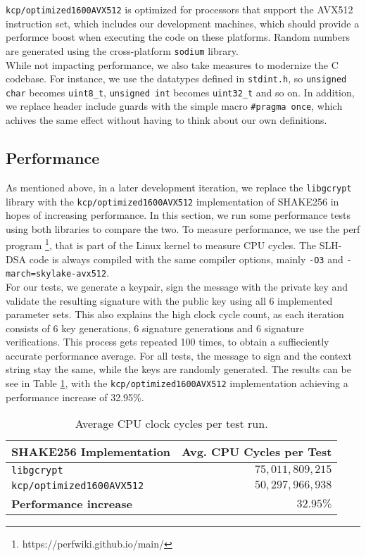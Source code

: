 \documentclass[journal=tosc,notanonymous]{iacrtrans}
\begin{document}
\texttt{kcp/optimized1600AVX512} is optimized for processors that support the AVX512 instruction set, which includes our development machines, which should provide a performce boost when executing the code on these platforms.
Random numbers are generated using the cross-platform \texttt{sodium} library.
\\
While not impacting performance, we also take measures to modernize the C codebase.
For instance, we use the datatypes defined in \texttt{stdint.h}, so \texttt{unsigned char} becomes \texttt{uint8\_t}, \texttt{unsigned int} becomes \texttt{uint32\_t} and so on.
In addition, we replace header include guards with the simple macro \texttt{\#pragma once}, which achives the same effect without having to think about our own definitions.


\subsection{Performance}

As mentioned above, in a later development iteration, we replace the \texttt{libgcrypt} library with the \texttt{kcp/optimized1600AVX512} implementation of SHAKE256 in hopes of increasing performance.
In this section, we run some performance tests using both libraries to compare the two.
To measure performance, we use the perf program \footnote{https://perfwiki.github.io/main/}, that is part of the Linux kernel to measure CPU cycles.
The SLH-DSA code is always compiled with the same compiler options, mainly \texttt{-O3} and \texttt{-march=skylake-avx512}.
\\
For our tests, we generate a keypair, sign the message with the private key and validate the resulting signature with the public key using all 6 implemented parameter sets.
This also explains the high clock cycle count, as each iteration consists of 6 key generations, 6 signature generations and 6 signature verifications.
This process gets repeated 100 times, to obtain a suffieciently accurate performance average.
For all tests, the message to sign and the context string stay the same, while the keys are randomly generated.
The results can be see in Table \ref{tab:cycles}, with the \texttt{kcp/optimized1600AVX512} implementation achieving a performance increase of 32.95\%.

\begin{table}[ht]
\centering
\begin{tabular}{ l | r }
    \textbf{SHAKE256 Implementation} & \textbf{Avg. CPU Cycles per Test} \\
    \hline
    \texttt{libgcrypt} & $75,011,809,215$ \\
    \texttt{kcp/optimized1600AVX512} & $50,297,966,938$ \\
    \hline
    \textbf{Performance increase} & $32.95\%$
\end{tabular}
     \caption{\label{tab:cycles}Average CPU clock cycles per test run.}
\end{table}
\end{document}
